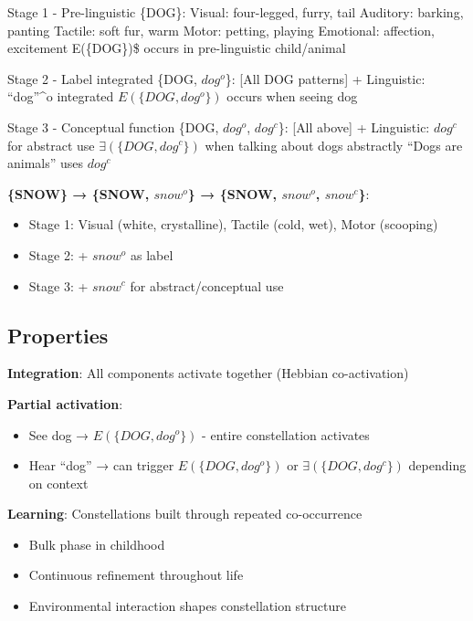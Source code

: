 \documentclass[12pt]{article}
\providecommand{\tightlist}{}   %
\begin{document}
Stage 1 - Pre-linguistic \{DOG\}: Visual: four-legged, furry, tail Auditory: barking, panting Tactile: soft fur, warm Motor: petting, playing Emotional: affection, excitement E(\{DOG\})\$ occurs in pre-linguistic child/animal

Stage 2 - Label integrated \{DOG, \(dog^o\)\}: {[}All DOG patterns{]} + Linguistic: ``dog''\^{}o integrated \(E(\{DOG, dog^o\})\) occurs when seeing dog

Stage 3 - Conceptual function \{DOG, \(dog^o\), \(dog^c\)\}: {[}All above{]} + Linguistic: \(dog^c\) for abstract use \(\exists(\{DOG, dog^c\})\) when talking about dogs abstractly ``Dogs are animals'' uses \(dog^c\)

\textbf{\{SNOW\} → \{SNOW, \(snow^o\)\} → \{SNOW, \(snow^o\), \(snow^c\)\}}:

\begin{itemize}
\tightlist
\item
  Stage 1: Visual (white, crystalline), Tactile (cold, wet), Motor (scooping)
\item
  Stage 2: + \(snow^o\) as label
\item
  Stage 3: + \(snow^c\) for abstract/conceptual use
\end{itemize}

\subsection{Properties}\label{properties}

\textbf{Integration}: All components activate together (Hebbian co-activation)

\textbf{Partial activation}:

\begin{itemize}
\tightlist
\item
  See dog → \(E(\{DOG, dog^o\})\) - entire constellation activates
\item
  Hear ``dog'' → can trigger \(E(\{DOG, dog^o\})\) or \(\exists(\{DOG, dog^c\})\) depending on context
\end{itemize}

\textbf{Learning}: Constellations built through repeated co-occurrence

\begin{itemize}
\tightlist
\item
  Bulk phase in childhood
\item
  Continuous refinement throughout life
\item
  Environmental interaction shapes constellation structure
\end{itemize}
\end{document}
